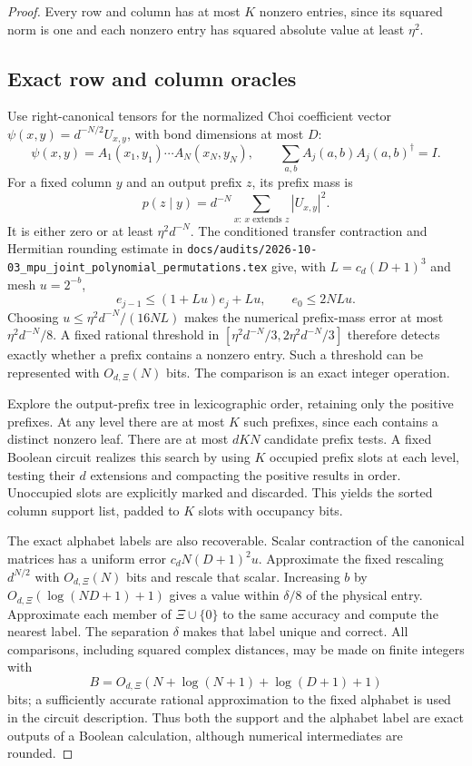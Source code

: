 \documentclass[11pt]{article}
\begin{document}
\begin{proof}
Every row and column has at most $K$ nonzero entries, since
its squared norm is one and each nonzero entry has squared
absolute value at least $\eta^2$.

\subsection*{Exact row and column oracles}

Use right-canonical tensors for the normalized Choi coefficient
vector $\psi(x,y)=d^{-N/2}U_{x,y}$, with bond dimensions at most
$D$:
\[
 \psi(x,y)=A_1(x_1,y_1)\cdots A_N(x_N,y_N),\qquad
 \sum_{a,b}A_j(a,b)A_j(a,b)^\dagger=I.
\]
For a fixed column $y$ and an output prefix $z$, its prefix
mass is
\[
 p(z\mid y)=d^{-N}\sum_{x:\,x\text{ extends }z}|U_{x,y}|^2.
\]
It is either zero or at least $\eta^2d^{-N}$.
The conditioned transfer contraction and Hermitian rounding
estimate in
\nolinkurl{docs/audits/2026-10-03_mpu_joint_polynomial_permutations.tex}
give, with $L=c_d(D+1)^3$ and mesh $u=2^{-b}$,
\[
 e_{j-1}\le(1+Lu)e_j+Lu,\qquad
 e_0\le2NLu.
\]
Choosing $u\le\eta^2d^{-N}/(16NL)$ makes the numerical
prefix-mass error at most $\eta^2d^{-N}/8$.
A fixed rational threshold in
$[\eta^2d^{-N}/3,2\eta^2d^{-N}/3]$ therefore detects exactly
whether a prefix contains a nonzero entry. Such a threshold
can be represented with $O_{d,\Xi}(N)$ bits.
The comparison is an exact integer operation.

Explore the output-prefix tree in lexicographic order, retaining
only the positive prefixes. At any level there are at most $K$
such prefixes, since each contains a distinct nonzero leaf.
There are at most $dKN$ candidate prefix tests. A fixed
Boolean circuit realizes this search by using $K$ occupied
prefix slots at each level, testing their $d$ extensions and
compacting the positive results in order. Unoccupied slots
are explicitly marked and discarded. This yields the sorted
column support list, padded to $K$ slots with occupancy bits.

The exact alphabet labels are also recoverable. Scalar
contraction of the canonical matrices has a uniform error
$c_dN(D+1)^2u$. Approximate the fixed rescaling
$d^{N/2}$ with $O_{d,\Xi}(N)$ bits and rescale that scalar.
Increasing $b$ by $O_{d,\Xi}(\log(ND+1)+1)$ gives a value
within $\delta/8$ of the physical entry.
Approximate each member of $\Xi\cup\{0\}$ to the same
accuracy and compute the nearest label. The separation
$\delta$ makes that label unique and correct.
All comparisons, including squared complex distances, may
be made on finite integers with
\[
 B=O_{d,\Xi}(N+\log(N+1)+\log(D+1)+1)
\]
bits; a sufficiently accurate rational approximation to the
fixed alphabet is used in the circuit description.
Thus both the support and the alphabet label are exact
outputs of a Boolean calculation, although numerical
intermediates are rounded.


\end{proof}
\end{document}
